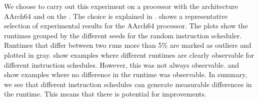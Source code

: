 We choose to carry out this experiment on a processor with the architecture AArch64 and on the \aurora.
The choice is explained in .
 shows a representative selection of experimental results for the AArch64 processor.
The plots show the runtimes grouped by the different seeds for the random instruction scheduler.
Runtimes that differ between two runs more than 5\% are marked as outliers and plotted in gray.
 show examples where different runtimes are clearly observable for different instruction schedules.
However, this was not always observable.
 and  show examples where no difference in the runtime was observable.
In summary, we see that different instruction schedules can generate measurable differences in the runtime.
This means that there is potential for improvements.
